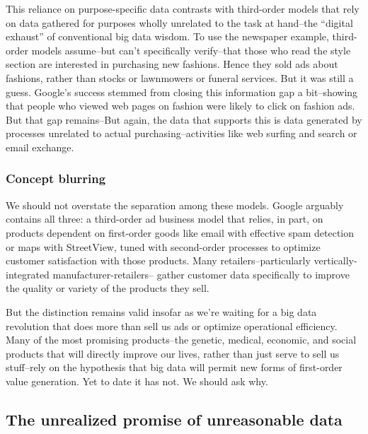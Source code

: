 \documentclass[12pt]{article}
\begin{document}
This reliance on purpose-specific data contrasts with third-order
models that rely on data gathered for purposes wholly unrelated to the
task at hand--the ``digital exhaust'' of conventional big data
wisdom. To use the newspaper example, third-order models assume--but
can't specifically verify--that those who read the style section are
interested in purchasing new fashions. Hence they sold ads about
fashions, rather than stocks or lawnmowers or funeral services. But it
was still a guess. Google's success stemmed from closing this
information gap a bit--showing that people who viewed web pages on
fashion were likely to click on fashion ads. But that gap remains--But
again, the data that supports this is data generated by processes
unrelated to actual purchasing--activities like web surfing and search
or email exchange.


\subsubsection{Concept blurring}
\label{sec:concept-blurring}

We should not overstate the separation among these models. Google
arguably contains all three: a third-order ad business model that
relies, in part, on products dependent on first-order goods like email
with effective spam detection or maps with StreetView, tuned with
second-order processes to optimize customer satisfaction with those
products. Many retailers--particularly vertically-integrated
manufacturer-retailers-- gather customer data specifically to improve
the quality or variety of the products they sell.

But the distinction remains valid insofar as we're waiting for a big
data revolution that does more than sell us ads or optimize
operational efficiency. Many of the most promising products--the
genetic, medical, economic, and social products that will directly
improve our lives, rather than just serve to sell us stuff--rely on
the hypothesis that big data will permit new forms of first-order
value generation. Yet to date it has not. We should ask why. 

\subsection{The unrealized promise of unreasonable data}
\label{sec:unre-prom-unre}
\end{document}
